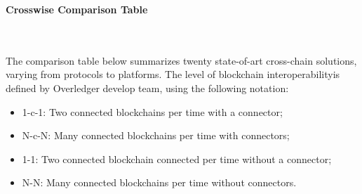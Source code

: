 \begin{huge}
\textbf{Crosswise Comparison Table}
\end{huge}
\\
\\

\noindent The comparison table below summarizes twenty state-of-art cross-chain solutions, varying from protocols to platforms. The level of blockchain interoperability\footnotemark[1] is defined by Overledger develop team, using the following notation:\\
\begin{itemize}
    \item 1-c-1: Two connected blockchains per time with a connector;
    \item N-c-N: Many connected blockchains per time with connectors;
    \item 1-1: Two connected blockchain connected per time without a connector;
    \item N-N: Many connected blockchains per time without connectors.
\end{itemize}


